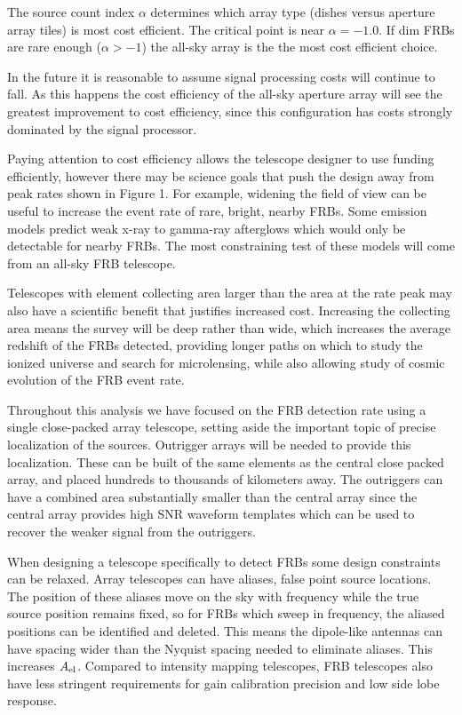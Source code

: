 \documentclass[fleqn,usenatbib]{mnras}
\begin{document}
The source count index $\alpha$ determines which array type (dishes versus aperture array tiles) is most cost efficient. The critical point is near $\alpha = -1.0$.  If dim FRBs are rare enough ($\alpha > -1$) the all-sky array is the the most cost efficient choice.

In the future it is reasonable to assume signal processing costs will continue to fall. As this happens the cost efficiency of the all-sky aperture array will see the greatest improvement to cost efficiency, since this configuration has costs strongly dominated by the signal processor.

Paying attention to cost efficiency allows the telescope designer to use funding efficiently, however there may be science goals that push the design away from peak rates shown in Figure 1. For example, widening the field of view can be useful to increase the event rate of rare, bright, nearby FRBs. 
Some emission models \citep{2019MNRAS.485.4091M} predict weak x-ray to gamma-ray afterglows which would only be detectable for nearby FRBs. The most constraining test of these models will come from an all-sky FRB telescope. 

Telescopes with element collecting area larger than the area at the rate peak may also have a scientific benefit that justifies increased cost. Increasing the collecting area means the survey will be deep rather than wide, which increases the average redshift of the FRBs detected, providing longer paths on which to study the ionized universe and search for microlensing, while also allowing study of cosmic evolution of the FRB event rate. 

Throughout this analysis we have focused on the FRB detection rate using a single close-packed array telescope, setting aside the important topic of precise localization of the sources. Outrigger arrays will be needed to provide this localization. These can be built of the same elements as the central close packed array, and placed hundreds to thousands of kilometers away.   The outriggers can have a combined area substantially smaller than the central array since the central array provides high SNR waveform templates which can be used to recover the weaker signal from the outriggers.

When designing a telescope specifically to detect FRBs some design constraints can be relaxed.  Array telescopes can have aliases, false point source locations. The position of these aliases move on the sky with frequency while the true source position remains fixed, so for FRBs which sweep in frequency, the aliased positions can be identified and deleted. This means the dipole-like antennas can have spacing wider than the Nyquist spacing needed to eliminate aliases. This increases $A_{\rm{el}}$. Compared to intensity mapping telescopes, FRB telescopes also have less stringent requirements for gain calibration precision and low side lobe response.
\end{document}
